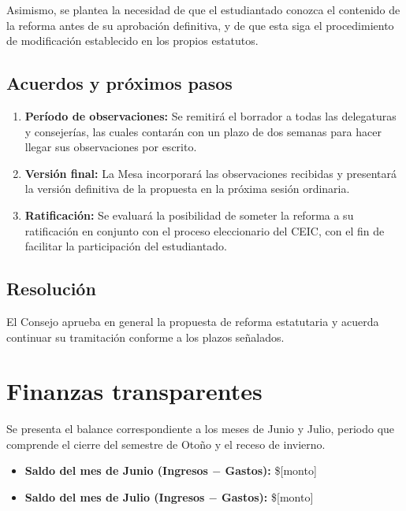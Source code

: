 \documentclass[12pt,letterpaper]{article}
\newif\ifrevision
\newcommand{\dato}[1]{\ifrevision\textcolor[HTML]{C0392B}{#1}\else#1\fi}
\begin{document}
Asimismo, se plantea la necesidad de que el estudiantado conozca el contenido de la reforma antes de su aprobación definitiva, y de que esta siga el procedimiento de modificación establecido en los propios estatutos.

\subsection{Acuerdos y próximos pasos}

\begin{enumerate}
  \item \textbf{Período de observaciones:} Se remitirá el borrador a todas las delegaturas y consejerías, las cuales contarán con un plazo de dos semanas para hacer llegar sus observaciones por escrito.
  \item \textbf{Versión final:} La Mesa incorporará las observaciones recibidas y presentará la versión definitiva de la propuesta en la próxima sesión ordinaria.
  \item \textbf{Ratificación:} Se evaluará la posibilidad de someter la reforma a su ratificación en conjunto con el proceso eleccionario del CEIC, con el fin de facilitar la participación del estudiantado.
\end{enumerate}

\subsection{Resolución}

El Consejo aprueba en general la propuesta de reforma estatutaria y acuerda continuar su tramitación conforme a los plazos señalados.

\section{Finanzas transparentes}

Se presenta el balance correspondiente a los meses de Junio y Julio, periodo que comprende el cierre del semestre de Otoño y el receso de invierno.

\begin{itemize}
  \item \textbf{Saldo del mes de Junio (Ingresos $-$ Gastos):} \dato{\$[monto]}
  \item \textbf{Saldo del mes de Julio (Ingresos $-$ Gastos):} \dato{\$[monto]}
\end{itemize}
\end{document}
